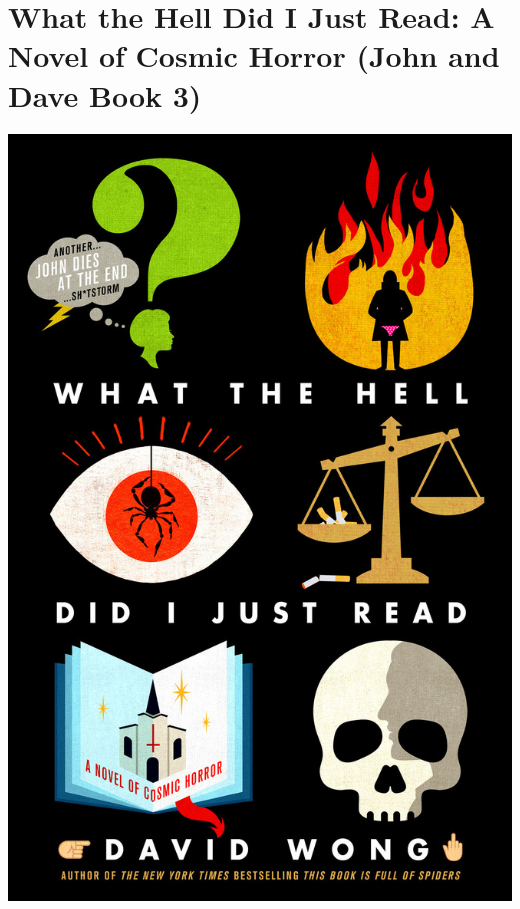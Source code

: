 \documentclass{tufte-handout}
\makeatletter
\newcommand{\varcaption}[2][0pt]{%
  \gsetlength{\@tufte@caption@vertical@offset}{-#1}%
  \gdef\@tufte@stored@varcaption{#2}%
}
\gdef\@tufte@stored@varcaption{} %
\makeatother
\begin{document}
\section*{What the Hell Did I Just Read: A Novel of Cosmic Horror (John and Dave Book 3)}
\begin{marginfigure}[5\baselineskip]
   \includegraphics[width=\linewidth]{images/what_the_hell_did_i_just_read.jpg}
   \varcaption{\href{https://us.macmillan.com/books/9781250040206}{Publisher Link}, \href{https://www.amazon.com/What-Hell-Did-Just-Read/dp/1250135311/}{Amazon Link}}
\end{marginfigure}
\end{document}
